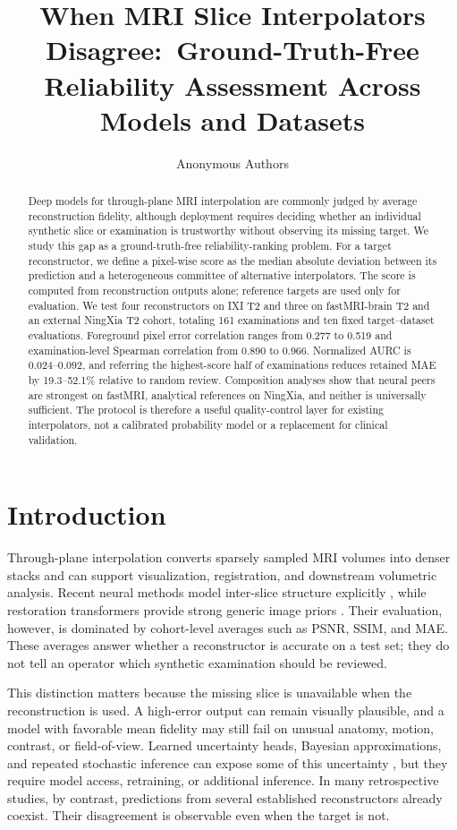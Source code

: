 \documentclass[twocolumn]{article}
\title{When MRI Slice Interpolators Disagree:\
Ground-Truth-Free Reliability Assessment Across Models and Datasets}
\author{Anonymous Authors}
\date{}
\begin{document}
\maketitle

\begin{abstract}
Deep models for through-plane MRI interpolation are commonly judged by average reconstruction fidelity, although deployment requires deciding whether an individual synthetic slice or examination is trustworthy without observing its missing target. We study this gap as a ground-truth-free reliability-ranking problem. For a target reconstructor, we define a pixel-wise score as the median absolute deviation between its prediction and a heterogeneous committee of alternative interpolators. The score is computed from reconstruction outputs alone; reference targets are used only for evaluation. We test four reconstructors on IXI T2 and three on fastMRI-brain T2 and an external NingXia T2 cohort, totaling 161 examinations and ten fixed target--dataset evaluations. Foreground pixel error correlation ranges from 0.277 to 0.519 and examination-level Spearman correlation from 0.890 to 0.966. Normalized AURC is 0.024--0.092, and referring the highest-score half of examinations reduces retained MAE by 19.3--52.1\% relative to random review. Composition analyses show that neural peers are strongest on fastMRI, analytical references on NingXia, and neither is universally sufficient. The protocol is therefore a useful quality-control layer for existing interpolators, not a calibrated probability model or a replacement for clinical validation.
\end{abstract}

\section{Introduction}

Through-plane interpolation converts sparsely sampled MRI volumes into denser stacks and can support visualization, registration, and downstream volumetric analysis. Recent neural methods model inter-slice structure explicitly \citep{song2024i3net}, while restoration transformers provide strong generic image priors \citep{liang2021swinir,chen2022hat}. Their evaluation, however, is dominated by cohort-level averages such as PSNR, SSIM, and MAE. These averages answer whether a reconstructor is accurate on a test set; they do not tell an operator which synthetic examination should be reviewed.

This distinction matters because the missing slice is unavailable when the reconstruction is used. A high-error output can remain visually plausible, and a model with favorable mean fidelity may still fail on unusual anatomy, motion, contrast, or field-of-view. Learned uncertainty heads, Bayesian approximations, and repeated stochastic inference can expose some of this uncertainty \citep{gal2016dropout,kendall2017uncertainties,lakshminarayanan2017deepensembles}, but they require model access, retraining, or additional inference. In many retrospective studies, by contrast, predictions from several established reconstructors already coexist. Their disagreement is observable even when the target is not.
\end{document}
